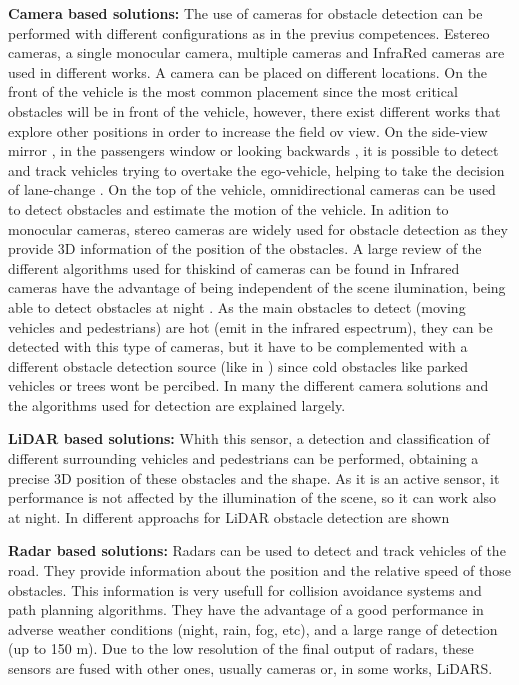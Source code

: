 \textbf{Camera based solutions:}
The use of cameras for obstacle detection can be performed with different configurations as in the previus competences. Estereo cameras, a single monocular camera, multiple cameras and InfraRed cameras are used in different works.
A camera can be placed on different locations. On the front of the vehicle is the most common placement since the most critical obstacles will be in front of the vehicle, however, there exist different works that explore other positions in order to increase the field ov view. On the side-view mirror \cite{alonso2008lane, song2007lateral, blanc2007larasidecam} , in the passengers window \cite{chang2008real} or looking backwards \cite{liu2007rear}, it is possible to detect and track vehicles trying to overtake the ego-vehicle, helping to take the decision of lane-change \cite{alonso2008lane, song2007lateral, blanc2007larasidecam}. On the top of the vehicle, omnidirectional cameras can be used to detect obstacles and estimate the motion of the vehicle\cite{gandhi2006vehicle}.
In adition to monocular cameras, stereo cameras are widely used for obstacle detection as they provide 3D information of the position of the obstacles. A large review of the different algorithms used for thiskind of cameras can be found in \cite{bernini2014real}
Infrared cameras have the advantage of being independent of the scene ilumination, being able to detect obstacles at night \cite{olmeda2013pedestrian}. As the main obstacles to detect (moving vehicles and pedestrians) are hot (emit in the infrared espectrum), they can be detected with this type of cameras, but it have to be complemented with a different obstacle detection source (like in \cite{krotosky2007color}) since cold obstacles like parked vehicles or trees wont be percibed.
In \cite{sivaraman2013looking} many the different camera solutions and the algorithms used for detection are explained largely.


\textbf{LiDAR based solutions:}
Whith this sensor, a detection and classification of different surrounding vehicles and pedestrians can be performed, obtaining a precise 3D position of these obstacles and the shape. As it is an active sensor, it performance is not affected by the illumination of the scene, so it can work also at night. In \cite{li2016vehicle} different approachs for LiDAR obstacle detection are shown

\textbf{Radar based solutions:}
Radars can be used to detect and track vehicles of the road. They provide information about the position and the relative speed of those obstacles. This information is very usefull for collision avoidance systems and path planning algorithms. They have the advantage of a good performance in adverse weather conditions (night, rain, fog, etc), and a large range of detection (up to 150 m)\cite{blanc2004obstacle}. Due to the low resolution of the final output of radars, these sensors are fused with other ones, usually cameras\cite{garcia2012data} or, in some works, LiDARS\cite{gohring2011radar}.

